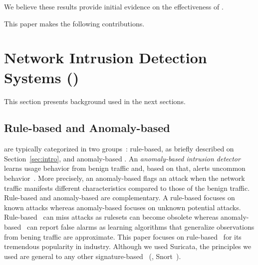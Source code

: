 \documentclass[sigconf,review, anonymous]{acmart}
\begin{document}





 We believe these results provide initial
evidence on the effectiveness of \tname{}.

This paper makes the following contributions.

\section{Network Intrusion Detection Systems (\nids)}
\label{sec:background}

This section presents background used in the next sections.

\subsection{Rule-based and Anomaly-based \nids}

\sloppy \nids{} are typically categorized in two
groups~\cite{kumar2007survey}: rule-based, as briefly described on
Section~\ref{sec:intro}, and anomaly-based \nids. An
\emph{anomaly-based intrusion detector} learns usage behavior from
benign traffic and, based on that, alerts uncommon
behavior~\cite{7579764,kumar2007survey,Mitchell:2014:SID:2597757.2542049,cordy-etal-issta19}. More
precisely, an anomaly-based \nids{} flags an attack when the network
traffic manifests different characteristics compared to those of the
benign traffic. Rule-based \nids{} and anomaly-based \nids{} are
complementary. A rule-based \nids{} focuses on known attacks whereas
anomaly-based \nids{} focuses on unknown potential attacks. Rule-based
\nids\ can miss attacks as rulesets can become obsolete whereas
anomaly-based \nids\ can report false alarms as learning algorithms
that generalize observations from bening traffic are approximate.
This paper focuses on rule-based \nids\ for its tremendous popularity
in industry. Although we used Suricata, the
principles we used are general to any other signature-based
\nids~(\eg{}, Snort~\cite{snort}).
\end{document}
